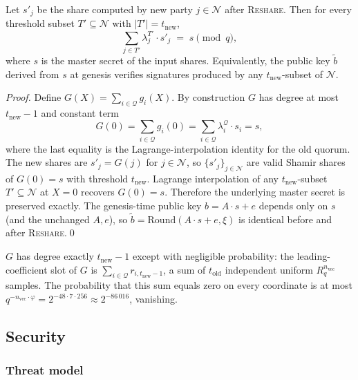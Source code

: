 \begin{theorem}
\label{thm:resharing-pk-invariant}
Let $s'_j$ be the share computed by new party $j \in \mathcal{N}$ after \textsc{Reshare}. Then for every threshold subset $T' \subseteq \mathcal{N}$ with $|T'| = t_{\mathrm{new}}$,
\[
\sum_{j \in T'} \lambda_j^{T'} \cdot s'_j \;=\; s \pmod{q},
\]
where $s$ is the master secret of the input shares. Equivalently, the public key $\tilde b$ derived from $s$ at genesis verifies signatures produced by any $t_{\mathrm{new}}$-subset of $\mathcal{N}$.
\end{theorem}

\begin{proof}
Define $G(X) = \sum_{i \in \mathcal{Q}} g_i(X)$. By construction $G$ has degree at most $t_{\mathrm{new}} - 1$ and constant term
\[
G(0) = \sum_{i \in \mathcal{Q}} g_i(0) = \sum_{i \in \mathcal{Q}} \lambda_i^{\mathcal{Q}} \cdot s_i = s,
\]
where the last equality is the Lagrange-interpolation identity for the old quorum. The new shares are $s'_j = G(j)$ for $j \in \mathcal{N}$, so $\{s'_j\}_{j \in \mathcal{N}}$ are valid Shamir shares of $G(0) = s$ with threshold $t_{\mathrm{new}}$. Lagrange interpolation of any $t_{\mathrm{new}}$-subset $T' \subseteq \mathcal{N}$ at $X = 0$ recovers $G(0) = s$. Therefore the underlying master secret is preserved exactly. The genesis-time public key $b = A \cdot s + e$ depends only on $s$ (and the unchanged $A, e$), so $\tilde b = \mathrm{Round}(A \cdot s + e, \xi)$ is identical before and after \textsc{Reshare}.\qed
\end{proof}

\begin{remark}[Degree of $G$]
$G$ has degree exactly $t_{\mathrm{new}} - 1$ except with negligible probability: the leading-coefficient slot of $G$ is $\sum_{i \in \mathcal{Q}} r_{i, t_{\mathrm{new}}-1}$, a sum of $t_{\mathrm{old}}$ independent uniform $R_q^{n_{\textrm{vec}}}$ samples. The probability that this sum equals zero on every coordinate is at most $q^{-n_{\textrm{vec}} \cdot \varphi} = 2^{-48 \cdot 7 \cdot 256} \approx 2^{-86\,016}$, vanishing.
\end{remark}

\subsection{Security}

\subsubsection{Threat model}

